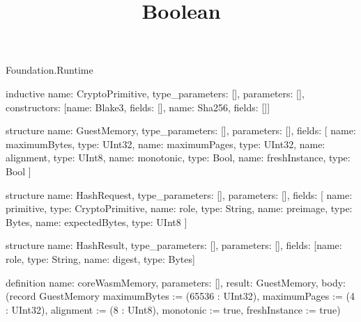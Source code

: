 \begin{lexlean}{Foundation.Runtime}
\title{Boolean}
\begin{semanticmodule}
inductive{
  name: CryptoPrimitive,
  type_parameters: [],
  parameters: [],
  constructors: [{name: Blake3, fields: []}, {name: Sha256, fields: []}]
}

structure{
  name: GuestMemory,
  type_parameters: [],
  parameters: [],
  fields: [
    {name: maximumBytes, type: UInt32},
    {name: maximumPages, type: UInt32},
    {name: alignment, type: UInt8},
    {name: monotonic, type: Bool},
    {name: freshInstance, type: Bool}
  ]
}

structure{
  name: HashRequest,
  type_parameters: [],
  parameters: [],
  fields: [
    {name: primitive, type: CryptoPrimitive},
    {name: role, type: String},
    {name: preimage, type: Bytes},
    {name: expectedBytes, type: UInt8}
  ]
}

structure{
  name: HashResult,
  type_parameters: [],
  parameters: [],
  fields: [{name: role, type: String}, {name: digest, type: Bytes}]
}

definition{
  name: coreWasmMemory,
  parameters: [],
  result: GuestMemory,
  body: (record GuestMemory {maximumBytes := (65536 : UInt32), maximumPages := (4 : UInt32), alignment := (8 : UInt8), monotonic := true, freshInstance := true})
}
\end{semanticmodule}
\end{lexlean}
